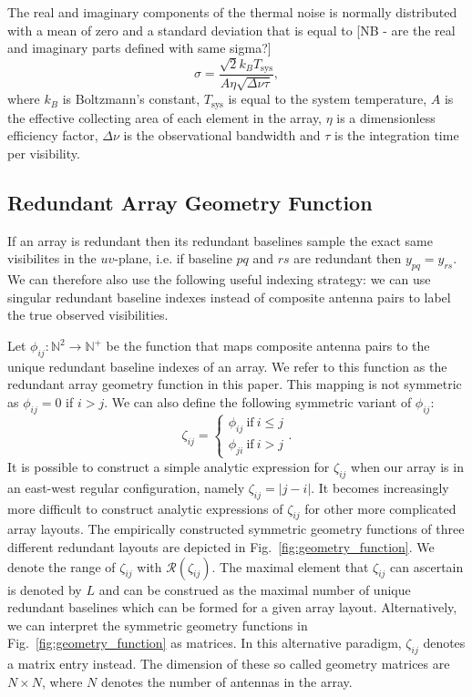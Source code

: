 \documentclass[useAMS,usenatbib]{mn2e}
\begin{document}
The real and imaginary components of the thermal noise is normally distributed with a mean of zero and a standard deviation that is equal to [NB - are the real and imaginary parts defined with same sigma?]  
\begin{equation}
\sigma = \frac{\sqrt{2}k_{B}T_{\textrm{sys}}}{A\eta\sqrt{\Delta \nu \tau}}, 
\end{equation}
where $k_B$ is Boltzmann's constant, $T_{\textrm{sys}}$ is equal to the system temperature, $A$ is the effective collecting area of each element in the array, $\eta$ is a dimensionless
efficiency factor, $\Delta \nu$ is the observational bandwidth and $\tau$ is the integration time per visibility. 

\subsection{Redundant Array Geometry Function}
If an array is redundant then its redundant baselines sample the exact same visibilites in the $uv$-plane, i.e. if baseline $pq$ and $rs$ are redundant then $y_{pq} = y_{rs}$. We can
therefore also use the following useful indexing strategy: we can use singular redundant baseline indexes instead of composite antenna pairs to label the true observed visibilities. 

Let $\phi_{ij}:\mathbb{N}^2\rightarrow\mathbb{N}^+$ be the function that maps composite antenna pairs to the unique redundant baseline indexes of an array. We refer to this function 
as the redundant array geometry function in this paper. This mapping is not symmetric as 
$\phi_{ij} = 0$ if $i>j$. We can also define the following symmetric variant of $\phi_{ij}$:
\begin{equation}
\zeta_{ij} = 
\begin{cases}
\phi_{ij}~\textrm{if}~i\leq j\\
\phi_{ji}~\textrm{if}~i>j
\end{cases}.
\end{equation} 
It is possible to construct a simple analytic expression for $\zeta_{ij}$ when our array is in an east-west regular configuration, namely $\zeta_{ij} = |j-i|$. 
It becomes increasingly more difficult to construct analytic expressions of $\zeta_{ij}$ for other more complicated array layouts. The empirically constructed symmetric geometry
functions of three different redundant layouts are depicted in Fig.~\ref{fig:geometry_function}. We denote the range of $\zeta_{ij}$ with $\mathcal{R}(\zeta_{ij})$. The maximal element 
that $\zeta_{ij}$ can ascertain is denoted by $L$ and can be construed as the maximal number of unique redundant baselines which can be formed for a given 
array layout. Alternatively, we can interpret the symmetric geometry functions 
in Fig.~\ref{fig:geometry_function} as matrices. In this alternative paradigm, $\zeta_{ij}$ denotes a matrix entry instead. The dimension of these so called geometry 
matrices are $N\times N$, where $N$ denotes the number of antennas in the array. 
\end{document}
